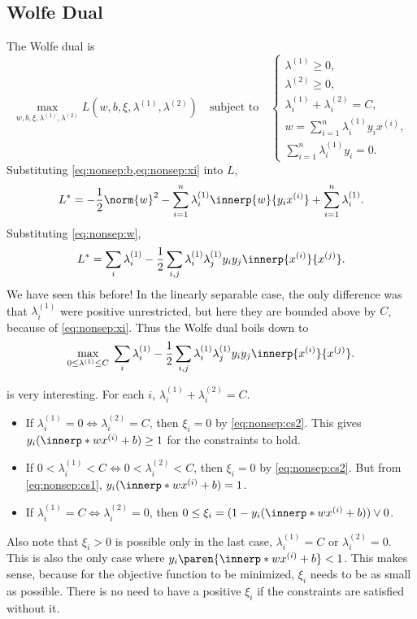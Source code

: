 \subsection{Wolfe Dual} \label{sec:svm:nonsep:wolfe}
The Wolfe dual is \[
    \max_{w, b, \xi, \lambda^{(1)}, \lambda^{(2)}}
        L(w, b, \xi, \lambda^{(1)}, \lambda^{(2)})
    \quad\text{subject to}\quad
    \begin{cases}
        \lambda^{(1)} \ge 0, \\
        \lambda^{(2)} \ge 0, \\
        \lambda^{(1)}_i + \lambda^{(2)}_i = C, \\
        w = \sum_{i=1}^n \lambda^{(1)}_i y_i x^{(i)}, \\
        \sum_{i=1}^n \lambda^{(1)}_i y_i = 0.
    \end{cases}
\]
Substituting \cref{eq:nonsep:b,eq:nonsep:xi} into $L$, \[
    L^* = -\frac12 \norm{w}^2 - \sum_{i=1}^n \lambda^{(1)}_i
        \innerp{w}{y_i x^{(i)}} + \sum_{i=1}^n \lambda^{(1)}_i.
\] Substituting \cref{eq:nonsep:w}, \[
    L^* = \sum_i \lambda^{(1)}_i
            -\frac12 \sum_{i,j} \lambda^{(1)}_i \lambda^{(1)}_j y_i y_j
                                        \innerp{x^{(i)}}{x^{(j)}}.
\] We have seen this before!
In the linearly separable case, the only difference was that
$\lambda^{(1)}_i$ were positive unrestricted, but here they are bounded
above by $C$, because of \cref{eq:nonsep:xi}.
Thus the Wolfe dual boils down to \[
    \max_{0 \le \lambda^{(1)} \le C}\;
        \sum_i \lambda^{(1)}_i
        -\frac12 \sum_{i,j} \lambda^{(1)}_i \lambda^{(1)}_j y_i y_j
            \innerp{x^{(i)}}{x^{(j)}}.
\]

 is very interesting.
For each $i$, $\lambda^{(1)}_i + \lambda^{(2)}_i = C$.
\begin{itemize}
    \item If $\lambda^{(1)}_i = 0 \iff \lambda^{(2)}_i = C$,
    then $\xi_i = 0$ by \cref{eq:nonsep:cs2}.
    This gives $y_i (\innerp*{w}{x^{(i)}} + b) \ge 1$ for the constraints
    to hold.
    \item If $0 < \lambda^{(1)}_i < C \iff 0 < \lambda^{(2)}_i < C$,
    then $\xi_i = 0$ by \cref{eq:nonsep:cs2}.
    But from \cref{eq:nonsep:cs1}, $y_i (\innerp*{w}{x^{(i)}} + b) = 1$.
    \item If $\lambda^{(1)}_i = C \iff \lambda^{(2)}_i = 0$,
    then $0 \le \xi_i = (1 - y_i (\innerp*{w}{x^{(i)}} + b)) \vee 0$.
\end{itemize}
Also note that $\xi_i > 0$ is possible only in the last case,
$\lambda^{(1)}_i = C$ or $\lambda^{(2)}_i = 0$.
This is also the only case where $y_i \paren{\innerp*{w}{x^{(i)}} + b} < 1$.
This makes sense, because for the objective function to be minimized,
$\xi_i$ needs to be as small as possible.
There is no need to have a positive $\xi_i$ if the constraints are satisfied
without it.

